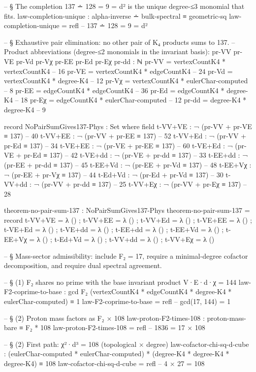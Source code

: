 \documentclass[11pt,a4paper]{book}
\begin{document}
\begin{code}
-- § The completion 137 ∸ 128 = 9 = d² is the unique degree-≤3 monomial that fits.
law-completion-unique : alpha-inverse ∸ bulk-spectral ≡ geometric-sq
law-completion-unique = refl  -- 137 ∸ 128 = 9 = d²

-- § Exhaustive pair elimination: no other pair of K₄ products sums to 137.
-- Product abbreviations (degree-≤2 monomials in the invariant basis):
pr-VV pr-VE pr-Vd pr-Vχ pr-EE pr-Ed pr-Eχ pr-dd : ℕ
pr-VV = vertexCountK4 * vertexCountK4      -- 16
pr-VE = vertexCountK4 * edgeCountK4        -- 24
pr-Vd = vertexCountK4 * degree-K4          -- 12
pr-Vχ = vertexCountK4 * eulerChar-computed  -- 8
pr-EE = edgeCountK4   * edgeCountK4        -- 36
pr-Ed = edgeCountK4   * degree-K4          -- 18
pr-Eχ = edgeCountK4   * eulerChar-computed  -- 12
pr-dd = degree-K4     * degree-K4          -- 9

record NoPairSumGives137-Phys : Set where
  field
    t-VV+VE : ¬ (pr-VV + pr-VE ≡ 137)   -- 40
    t-VV+EE : ¬ (pr-VV + pr-EE ≡ 137)   -- 52
    t-VV+Ed : ¬ (pr-VV + pr-Ed ≡ 137)   -- 34
    t-VE+EE : ¬ (pr-VE + pr-EE ≡ 137)   -- 60
    t-VE+Ed : ¬ (pr-VE + pr-Ed ≡ 137)   -- 42
    t-VE+dd : ¬ (pr-VE + pr-dd ≡ 137)   -- 33
    t-EE+dd : ¬ (pr-EE + pr-dd ≡ 137)   -- 45
    t-EE+Vd : ¬ (pr-EE + pr-Vd ≡ 137)   -- 48
    t-EE+Vχ : ¬ (pr-EE + pr-Vχ ≡ 137)   -- 44
    t-Ed+Vd : ¬ (pr-Ed + pr-Vd ≡ 137)   -- 30
    t-VV+dd : ¬ (pr-VV + pr-dd ≡ 137)   -- 25
    t-VV+Eχ : ¬ (pr-VV + pr-Eχ ≡ 137)   -- 28

theorem-no-pair-sum-137 : NoPairSumGives137-Phys
theorem-no-pair-sum-137 = record
  { t-VV+VE = λ () ; t-VV+EE = λ () ; t-VV+Ed = λ ()
  ; t-VE+EE = λ () ; t-VE+Ed = λ () ; t-VE+dd = λ ()
  ; t-EE+dd = λ () ; t-EE+Vd = λ () ; t-EE+Vχ = λ ()
  ; t-Ed+Vd = λ () ; t-VV+dd = λ () ; t-VV+Eχ = λ ()
  }


-- § Mass-sector admissibility: include F₂ = 17, require a minimal-degree cofactor decomposition, and require dual spectral agreement.

-- § (1) F₂ shares no prime with the base invariant product V·E·d·χ = 144
law-F2-coprime-to-base :
  gcd F₂ (vertexCountK4 * edgeCountK4 * degree-K4 * eulerChar-computed) ≡ 1
law-F2-coprime-to-base = refl   -- gcd(17, 144) = 1

-- § (2) Proton mass factors as F₂ × 108
law-proton-F2-times-108 : proton-mass-bare ≡ F₂ * 108
law-proton-F2-times-108 = refl  -- 1836 = 17 × 108

-- § (2) First path: χ²·d³ = 108 (topological × degree)
law-cofactor-chi-sq-d-cube :
  (eulerChar-computed * eulerChar-computed)
  * (degree-K4 * degree-K4 * degree-K4) ≡ 108
law-cofactor-chi-sq-d-cube = refl  -- 4 × 27 = 108


\end{code}
\end{document}
